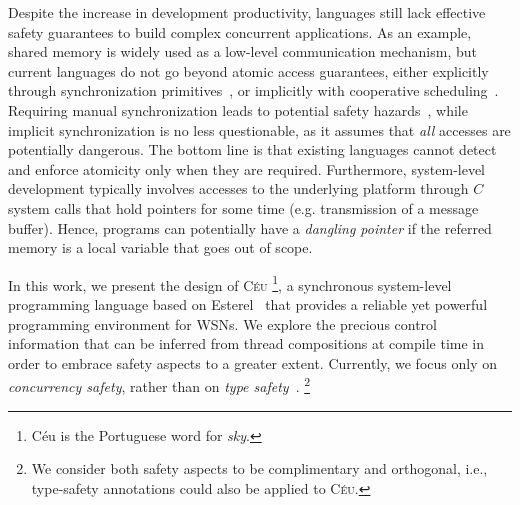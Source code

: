\documentclass[10pt]{sensys-proc}
\newcommand{\CEU}{\textsc{C\'{e}u}\xspace}
\begin{document}
Despite the increase in development productivity, languages still lack
effective safety guarantees to build complex concurrent applications.
%
As an example, shared memory is widely used as a low-level communication 
mechanism, but current languages do not go beyond atomic access guarantees, 
either explicitly through synchronization 
primitives~\cite{wsn.mantisos,wsn.tinythreads}, or implicitly with cooperative 
scheduling~\cite{wsn.sol,wsn.nesc}.
Requiring manual synchronization leads to potential safety 
hazards~\cite{sync_async.threadsproblems}, while implicit synchronization is no 
less questionable, as it assumes that \emph{all} accesses are potentially 
dangerous.
The bottom line is that existing languages cannot detect and enforce atomicity 
only when they are required.
%
Furthermore, system-level development typically involves accesses to the 
underlying platform through $C$ system calls that hold pointers for some time
(e.g. transmission of a message buffer).
Hence, programs can potentially have a \emph{dangling pointer} if the referred 
memory is a local variable that goes out of scope.

In this work, we present the design of \CEU%
\footnote{C\'eu is the Portuguese word for \emph{sky}.}, a synchronous 
system-level programming language based on Esterel~\cite{esterel.ieee91} that 
provides a reliable yet powerful programming environment for WSNs.
We explore the precious control information that can be inferred from thread
compositions at compile time in order to embrace safety aspects to a greater 
extent.
%
Currently, we focus only on \emph{concurrency safety}, rather than on 
\emph{type safety}~\cite{wsn.safety}.%
\footnote{
We consider both safety aspects to be complimentary and orthogonal, i.e., 
type-safety annotations could also be applied to \CEU.
}

\begin{comment}
TODO
\CEU is based on Esterel~\cite{esterel.ieee91} and follows a synchronous 
execution model~\cite{rp.twelve}, which enforces a disciplined step-by-step 
execution.
\CEU relies on a compile-time analysis to detect unbounded loops and concurrent 
access to variables.
\end{comment}
\end{document}
